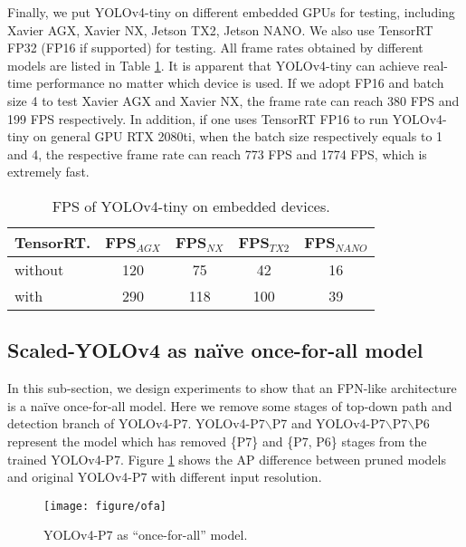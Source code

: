 \documentclass[10pt,twocolumn,letterpaper]{article}
\begin{document}
Finally, we put YOLOv4-tiny on different embedded GPUs for testing, including Xavier AGX, Xavier NX, Jetson TX2, Jetson NANO.  We also use TensorRT FP32 (FP16 if supported) for testing. All frame rates obtained by different models are listed in Table \ref{table:t15}.  It is apparent that YOLOv4-tiny can achieve real-time performance no matter which device is used.  If we adopt FP16 and batch size 4 to test Xavier AGX and Xavier NX, the frame rate can reach 380 FPS and 199 FPS respectively.  In addition, if one uses TensorRT FP16 to run YOLOv4-tiny on general GPU RTX 2080ti, when the batch size respectively equals to 1 and 4, the respective frame rate can reach 773 FPS and 1774 FPS, which is extremely fast.

\begin{table}[h]
	\centering
	\begin{threeparttable}[h]
		\footnotesize
		\caption{FPS of YOLOv4-tiny on embedded devices.}
		\label{table:t15}
		\setlength\tabcolsep{3.5pt}
		\begin{tabular}{lcccc}
			\toprule
			\textbf{TensorRT.} & \textbf{FPS$_{AGX}$} & \textbf{FPS$_{NX}$} & \textbf{FPS$_{TX2}$} & \textbf{FPS$_{NANO}$} \\				
			\midrule
			without & 120 & 75 & 42 & 16 \\
			with & 290 & 118 & 100 & 39 \\
			\bottomrule
		\end{tabular}
	\end{threeparttable}
\end{table}

\subsection{Scaled-YOLOv4 as na\"ive once-for-all model}

In this sub-section, we design experiments to show that an FPN-like architecture is a naïve once-for-all model. Here we remove some stages of top-down path and detection branch of YOLOv4-P7. YOLOv4-P7$\backslash$P7 and YOLOv4-P7$\backslash$P7$\backslash$P6 represent the model which has removed \{P7\} and \{P7, P6\} stages from the trained YOLOv4-P7. Figure \ref{fig:ofa} shows the AP difference between pruned models and original YOLOv4-P7 with different input resolution.



\begin{figure}[h]
	\begin{center}
		\texttt{[image: figure/ofa]}
	\end{center}
	\vspace{-4mm}
	\caption{YOLOv4-P7 as ``once-for-all'' model.}
	\vspace{4mm}
	\label{fig:ofa}
\end{figure}
\end{document}
